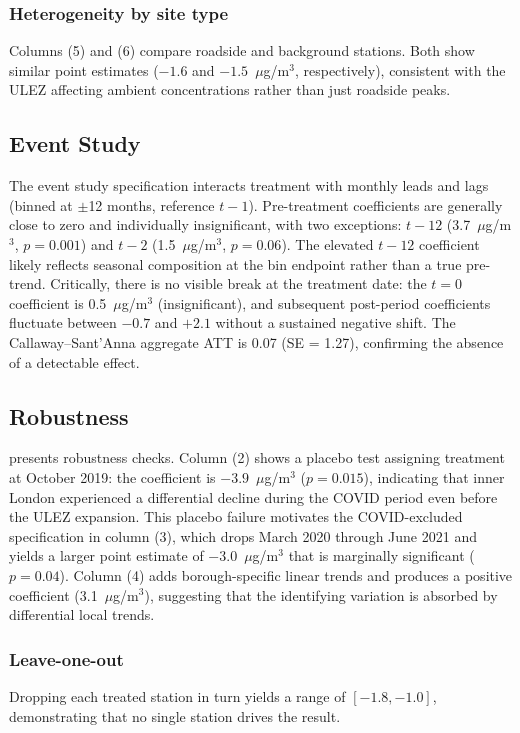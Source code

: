 \documentclass[12pt]{article}
\begin{document}
\subsubsection*{Heterogeneity by site type} Columns (5) and (6) compare roadside and background stations. Both show similar point estimates ($-1.6$ and $-1.5$~$\mu$g/m$^3$, respectively), consistent with the ULEZ affecting ambient concentrations rather than just roadside peaks.

\subsection{Event Study}

The event study specification interacts treatment with monthly leads and lags (binned at $\pm$12 months, reference $t-1$). Pre-treatment coefficients are generally close to zero and individually insignificant, with two exceptions: $t-12$ (3.7~$\mu$g/m$^3$, $p=0.001$) and $t-2$ (1.5~$\mu$g/m$^3$, $p=0.06$). The elevated $t-12$ coefficient likely reflects seasonal composition at the bin endpoint rather than a true pre-trend. Critically, there is no visible break at the treatment date: the $t=0$ coefficient is 0.5~$\mu$g/m$^3$ (insignificant), and subsequent post-period coefficients fluctuate between $-0.7$ and $+2.1$ without a sustained negative shift. The Callaway--Sant'Anna aggregate ATT is 0.07 (SE = 1.27), confirming the absence of a detectable effect.

\subsection{Robustness}



 presents robustness checks. Column (2) shows a placebo test assigning treatment at October 2019: the coefficient is $-3.9$~$\mu$g/m$^3$ ($p = 0.015$), indicating that inner London experienced a differential decline during the COVID period even before the ULEZ expansion. This placebo failure motivates the COVID-excluded specification in column (3), which drops March 2020 through June 2021 and yields a larger point estimate of $-3.0$~$\mu$g/m$^3$ that is marginally significant ($p = 0.04$). Column (4) adds borough-specific linear trends and produces a positive coefficient (3.1~$\mu$g/m$^3$), suggesting that the identifying variation is absorbed by differential local trends.

\subsubsection*{Leave-one-out} Dropping each treated station in turn yields a range of $[-1.8, -1.0]$, demonstrating that no single station drives the result.
\end{document}
